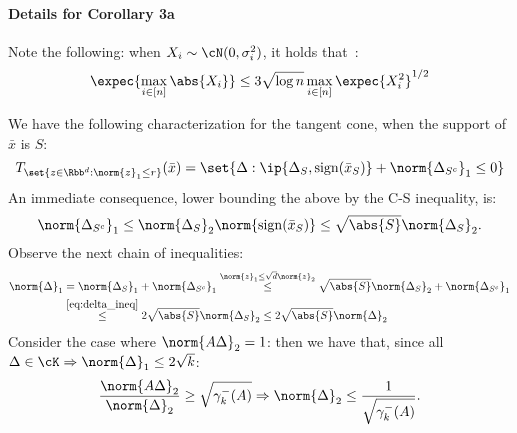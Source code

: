 \documentclass[a4paper]{article}
\begin{document}
\paragraph{Details for Corollary 3a}
Note the following: when $X_i \sim \cN(0, \sigma_i^2)$, it holds
that~\cite[Eq. (3.13)]{LedTal13}:
\begin{equation}
    \expec{\max_{i \in [n]} \abs{X_i}} \leq 3 \sqrt{\log n} \max_{i \in [n]}
    \expec{X_i^2}^{1/2}
    \label{eq:expected_sup_gaussian}
\end{equation}

We have the following characterization for the tangent cone, when the support of
$\bar{x}$ is $S$:
\[
    T_{\set{z \in \Rbb^d: \norm{z}_1 \leq r}}(\bar{x})
    = \set{\Delta: \ip{\Delta_S, \mathrm{sign}(\bar{x}_S)}
           + \norm{\Delta_{S^c}}_1 \leq 0}
\]
An immediate consequence, lower bounding the above by the C-S inequality, is:
\begin{equation}
    \norm{\Delta_{S^c}}_1 \leq \norm{\Delta_S}_2 \norm{\mathrm{sign}(\bar{x}_S)}
    \leq \sqrt{\abs{S}} \norm{\Delta_S}_2.
    \label{eq:delta_ineq}
\end{equation}
Observe the next chain of inequalities:
\begin{align*}
    \norm{\Delta}_1 &= \norm{\Delta_S}_1 + \norm{\Delta_{S^c}}_1
    \overset{\norm{z}_1 \leq \sqrt{d} \norm{z}_2}{\leq}
        \sqrt{\abs{S}} \norm{\Delta_S}_2 + \norm{\Delta_{S^c}}_1 \\
    &\overset{\eqref{eq:delta_ineq}}{\leq}
        2 \sqrt{\abs{S}} \norm{\Delta_S}_2 \leq 2 \sqrt{\abs{S}} \norm{\Delta}_2
\end{align*}
Consider the case where $\norm{A \Delta}_2 = 1$: then we have that, since all
$\Delta \in \cK \Rightarrow \norm{\Delta}_1 \leq 2 \sqrt{k}$:
\[
    \frac{\norm{A \Delta}_2}{\norm{\Delta}_2} \geq \sqrt{\gamma_k^-(A)}
    \Rightarrow \norm{\Delta}_2 \leq \frac{1}{\sqrt{\gamma_k^-(A)}}.
\]



\end{document}
